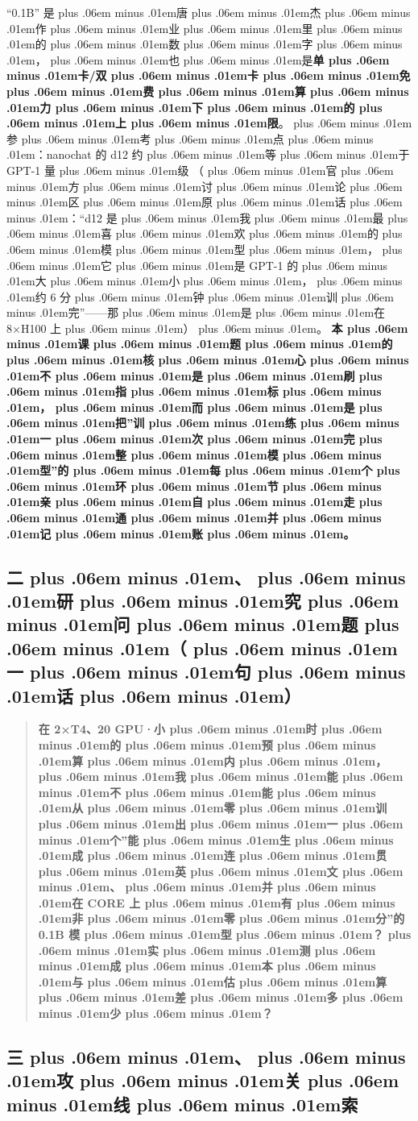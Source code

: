 \documentclass[
]{article}
\def\zh#1{{\zhfont #1}}
\def\sym#1{{\symfont #1}}
\def\zhglue{\hskip0pt plus .06em minus .01em}
\begin{document}
``0.1B'' \zh{是\zhglue 唐\zhglue 杰\zhglue 作\zhglue 业\zhglue 里\zhglue 的\zhglue 数\zhglue 字\zhglue ，\zhglue 也\zhglue 是}\textbf{\zh{单\zhglue 卡}/\zh{双\zhglue 卡\zhglue 免\zhglue 费\zhglue 算\zhglue 力\zhglue 下\zhglue 的\zhglue 上\zhglue 限}}\zh{。\zhglue 参\zhglue 考\zhglue 点\zhglue ：}nanochat \zh{的} d12 \zh{约\zhglue 等\zhglue 于} GPT-1 \zh{量\zhglue 级} \zh{（\zhglue 官\zhglue 方\zhglue 讨\zhglue 论\zhglue 区\zhglue 原\zhglue 话\zhglue ：}``d12 \zh{是\zhglue 我\zhglue 最\zhglue 喜\zhglue 欢\zhglue 的\zhglue 模\zhglue 型\zhglue ，\zhglue 它\zhglue 是} GPT-1 \zh{的\zhglue 大\zhglue 小\zhglue ，\zhglue 约} 6 \zh{分\zhglue 钟\zhglue 训\zhglue 完}''------\zh{那\zhglue 是\zhglue 在} 8\sym{×}H100 \zh{上\zhglue ）\zhglue 。} \textbf{\zh{本\zhglue 课\zhglue 题\zhglue 的\zhglue 核\zhglue 心\zhglue 不\zhglue 是\zhglue 刷\zhglue 指\zhglue 标\zhglue ，\zhglue 而\zhglue 是\zhglue 把}''\zh{训\zhglue 练\zhglue 一\zhglue 次\zhglue 完\zhglue 整\zhglue 模\zhglue 型}''\zh{的\zhglue 每\zhglue 个\zhglue 环\zhglue 节\zhglue 亲\zhglue 自\zhglue 走\zhglue 通\zhglue 并\zhglue 记\zhglue 账\zhglue 。}}

\subsection{\zh{二\zhglue 、\zhglue 研\zhglue 究\zhglue 问\zhglue 题\zhglue （\zhglue 一\zhglue 句\zhglue 话\zhglue ）}}\label{ux4e8cux7814ux7a76ux95eeux9898ux4e00ux53e5ux8bdd}

\begin{quote}
\textbf{\zh{在} 2\sym{×}T4\zh{、}20 GPU\sym{·}\zh{小\zhglue 时\zhglue 的\zhglue 预\zhglue 算\zhglue 内\zhglue ，\zhglue 我\zhglue 能\zhglue 不\zhglue 能\zhglue 从\zhglue 零\zhglue 训\zhglue 出\zhglue 一\zhglue 个}''\zh{能\zhglue 生\zhglue 成\zhglue 连\zhglue 贯\zhglue 英\zhglue 文\zhglue 、\zhglue 并\zhglue 在} CORE \zh{上\zhglue 有\zhglue 非\zhglue 零\zhglue 分}''\zh{的} 0.1B \zh{模\zhglue 型\zhglue ？\zhglue 实\zhglue 测\zhglue 成\zhglue 本\zhglue 与\zhglue 估\zhglue 算\zhglue 差\zhglue 多\zhglue 少\zhglue ？}}
\end{quote}

\subsection{\zh{三\zhglue 、\zhglue 攻\zhglue 关\zhglue 线\zhglue 索}}\label{ux4e09ux653bux5173ux7ebfux7d22}
\end{document}
